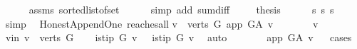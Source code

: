 \begin{isabellebody}
\ \ \ \ \isamarkupfalse%
\ assms\ sorted{\isacharunderscore}{\kern0pt}list{\isacharunderscore}{\kern0pt}of{\isacharunderscore}{\kern0pt}set{\isacharparenleft}{\kern0pt}{}{\isacharparenright}{\kern0pt}\isanewline
\ \ \ \ \isamarkupfalse%
\ {\isacharparenleft}{\kern0pt}simp\ add{\isacharcolon}{\kern0pt}\ sum{\isacharunderscore}{\kern0pt}diff{}{\isacharparenright}{\kern0pt}\ \isanewline
\ \ \isamarkupfalse%
\ {\isacharquery}{\kern0pt}thesis\isanewline
\ \ \ \ \isamarkupfalse%
\ s{\isacharunderscore}{\kern0pt}{}\ s{\isacharunderscore}{\kern0pt}{}\ s{\isacharunderscore}{\kern0pt}{}\ \isamarkupfalse%
\ simp\isanewline
{}\isamarkupfalse%
%
\endisatagproof
{\isafoldproof}%
%
\isadelimproof
%
\endisadelimproof
%
\isadelimdocument
%
\endisadelimdocument
%
\isatagdocument
%
\isamarkuptrue%
%
\endisatagdocument
{\isafolddocument}%
%
\isadelimdocument
%
\endisadelimdocument
{}\isamarkupfalse%
\ {\isacharparenleft}{\kern0pt}\ Honest{\isacharunderscore}{\kern0pt}Append{\isacharunderscore}{\kern0pt}One{\isacharparenright}{\kern0pt}\ reaches{\isacharunderscore}{\kern0pt}all{\isacharcolon}{\kern0pt}\isanewline
{\isachardoublequoteopen}{\isasymforall}v\ {\isasymin}\ verts\ G{\isachardot}{\kern0pt}\ app\ {\isasymrightarrow}\isactrlsup {\isacharplus}{\kern0pt}\isactrlbsub G{\isacharunderscore}{\kern0pt}A\isactrlesub \ v{\isachardoublequoteclose}\ \ \isanewline
%
\isadelimproof
%
\endisadelimproof
%
\isatagproof
{}\isamarkupfalse%
\ \isanewline
\ \ \isamarkupfalse%
\ v\ \isanewline
\ \ \isamarkupfalse%
\ v{\isacharunderscore}{\kern0pt}in{\isacharcolon}{\kern0pt}\ {\isachardoublequoteopen}v\ {\isasymin}\ verts\ G{\isachardoublequoteclose}\isanewline
\ \ \isamarkupfalse%
\ {\isachardoublequoteopen}is{\isacharunderscore}{\kern0pt}tip\ G\ v{\isachardoublequoteclose}\ {\isacharbar}{\kern0pt}\ {\isachardoublequoteopen}{\isasymnot}\ is{\isacharunderscore}{\kern0pt}tip\ G\ v{\isachardoublequoteclose}\ \isamarkupfalse%
\ auto\isanewline
\ \ \ \ \isamarkupfalse%
\ \isamarkupfalse%
\ {\isachardoublequoteopen}app\ {\isasymrightarrow}\isactrlsup {\isacharplus}{\kern0pt}\isactrlbsub G{\isacharunderscore}{\kern0pt}A\isactrlesub \ v{\isachardoublequoteclose}\isanewline
\ \ \isamarkupfalse%
{\isacharparenleft}{\kern0pt}cases{\isacharparenright}{\kern0pt}\isanewline

\end{isabellebody}
